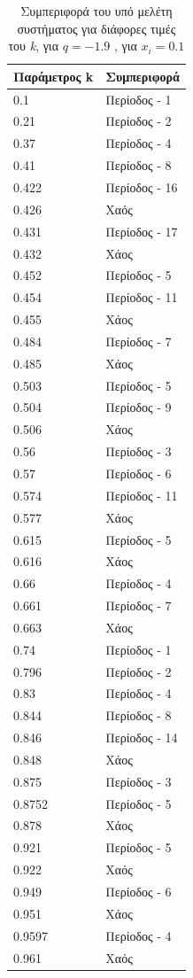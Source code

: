 \begin{table}[h!]
	\centering
	\caption{ Συμπεριφορά του υπό μελέτη συστήματος για διάφορες τιμές του \emph{k}, για $q=-1.9$ , για \(x_i=0.1\)}
	\label{tab:abc8}
	\begin{tabular}{l | l}
		Παράμετρος k & Συμπεριφορά \\
		\hline
		0.1 &  Περίοδος -  1 \\
		0.21 &  Περίοδος -  2 \\
		0.37& Περίοδος -  4 \\
		0.41& Περίοδος -  8 \\
		0.422 &  Περίοδος -  16 \\
		0.426& Χαός \\
		0.431& Περίοδος -  17 \\
		0.432& Χάος \\
		0.452 &  Περίοδος -  5 \\
		0.454 &  Περίοδος -  11 \\
		0.455 &  Χάος \\
		0.484 &  Περίοδος -  7\\
		0.485 & Χάος\\
		0.503 & Περίοδος -  5\\
		0.504 & Περίοδος -  9\\
		0.506 &Χάος\\
		0.56 & Περίοδος -  3\\
		0.57 & Περίοδος -  6\\
		0.574 & Περίοδος -  11\\
		0.577 & Χάος\\
		0.615 & Περίοδος -  5\\
		0.616 & Χάος\\
		0.66 & Περίοδος -  4\\
		0.661 & Περίοδος -  7\\
		0.663 & Χάος\\
		0.74 &  Περίοδος -  1\\
		0.796 &  Περίοδος -  2 \\
		0.83& Περίοδος -  4 \\
		0.844& Περίοδος -  8 \\
		0.846 &  Περίοδος -  14 \\
		0.848 &Χάος\\
		0.875& Περίοδος -  3\\
		0.8752 & Περίοδος -  5\\
		0.878 &Χάος\\
		0.921 &  Περίοδος -  5 \\
		0.922& Χαός\\
		0.949 & Περίοδος -  6 \\
		0.951& Χάος \\
		0.9597&Περίοδος -  4\\
		0.961& Χαός\\
	
		
	\end{tabular}
\end{table}

